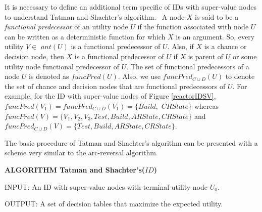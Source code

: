It is necessary to define an additional term specific of IDs with
super-value nodes to understand Tatman and Shachter's algorithm. \ A node $X$
is said to be a \textit{functional predecessor} of an utility node $U$ if
the function associated with node $U$ can be written as a deterministic
function for which $X$ is an argument. So, every utility $V\in $ $ant(U)$ is
a functional predecessor of $U.$ Also, if $X$ is a chance or decision node,
then $X$ is a functional predecessor of $U$ if $X$ is parent of $U$ or some
utility node functional predecessor of $U.$ The set of functional
predecessors of a node $U$ is denoted as $funcPred(U).$ Also, we use $%
funcPred_{C\cup D}(U)$ to denote the set of chance and decision nodes that
are functional predecessors of $U.$ For example, for the ID with super-value
nodes of Figure \ref{reactorIDSV}, $funcPred(V_{1})=funcPred_{C\cup
D}(V_{1})=\{Build,$ $CRState\}$ whereas $funcPred(V)=%
\{V_{1},V_{2},V_{3},Test,Build,ARState,CRState\}$ and $funcPred_{C\cup
D}(V)=\{Test,Build,ARState,CRState\}.$

The basic procedure of Tatman and Shachter's algorithm can be presented with
a scheme very similar to the arc-reversal algorithm.

\textsf{\textbf{ALGORITHM Tatman and Shachter's($ID$)}}

\bigskip \noindent INPUT: An ID with super-value nodes with terminal utility
node $U_{0}$.

\noindent OUTPUT: A set of decision tables that maximize the expected
utility.

